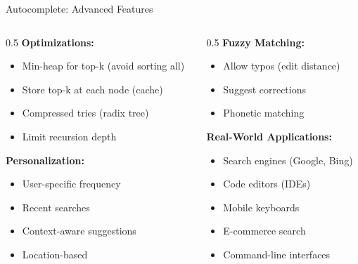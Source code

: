 \documentclass[aspectratio=169,xcolor=dvipsnames]{beamer}
\begin{document}
\begin{frame}{Autocomplete: Advanced Features}
  \begin{columns}
    \begin{column}{0.5\textwidth}
      \textbf{Optimizations:}
      \begin{itemize}
        \item Min-heap for top-k (avoid sorting all)
        \item Store top-k at each node (cache)
        \item Compressed tries (radix tree)
        \item Limit recursion depth
      \end{itemize}

      \vspace{0.3cm}
      \textbf{Personalization:}
      \begin{itemize}
        \item User-specific frequency
        \item Recent searches
        \item Context-aware suggestions
        \item Location-based
      \end{itemize}
    \end{column}

    \begin{column}{0.5\textwidth}
      \textbf{Fuzzy Matching:}
      \begin{itemize}
        \item Allow typos (edit distance)
        \item Suggest corrections
        \item Phonetic matching
      \end{itemize}

      \vspace{0.3cm}
      \textbf{Real-World Applications:}
      \begin{itemize}
        \item Search engines (Google, Bing)
        \item Code editors (IDEs)
        \item Mobile keyboards
        \item E-commerce search
        \item Command-line interfaces
      \end{itemize}
    \end{column}
  \end{columns}
\end{frame}
\end{document}
